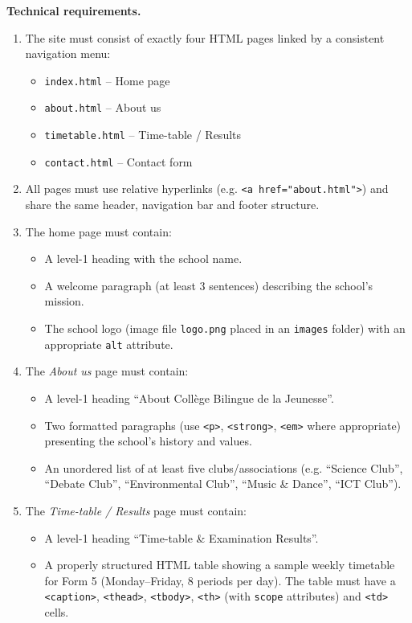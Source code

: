 \documentclass[11pt]{article}
\newcommand{\cle}[1]{{\popxbold\color{popdark}#1}}
\begin{document}
\textbf{Technical requirements.}
\begin{enumerate}
  \item The site must consist of exactly four HTML pages linked by a consistent navigation menu:
        \begin{itemize}
          \item \texttt{index.html} -- Home page
          \item \texttt{about.html} -- About us
          \item \texttt{timetable.html} -- Time-table / Results
          \item \texttt{contact.html} -- Contact form
        \end{itemize}
  \item All pages must use \cle{relative hyperlinks} (e.g. \texttt{<a href="about.html">}) and share the same header, navigation bar and footer structure.
  \item The home page must contain:
        \begin{itemize}
          \item A level-1 heading with the school name.
          \item A welcome paragraph (at least 3 sentences) describing the school's mission.
          \item The school logo (image file \texttt{logo.png} placed in an \texttt{images} folder) with an appropriate \texttt{alt} attribute.
        \end{itemize}
  \item The \emph{About us} page must contain:
        \begin{itemize}
          \item A level-1 heading ``About Coll\`ege Bilingue de la Jeunesse''.
          \item Two formatted paragraphs (use \texttt{<p>}, \texttt{<strong>}, \texttt{<em>} where appropriate) presenting the school's history and values.
          \item An unordered list of at least five clubs/associations (e.g. ``Science Club'', ``Debate Club'', ``Environmental Club'', ``Music \& Dance'', ``ICT Club'').
        \end{itemize}
  \item The \emph{Time-table / Results} page must contain:
        \begin{itemize}
          \item A level-1 heading ``Time-table \& Examination Results''.
          \item A properly structured HTML table showing a sample weekly timetable for Form 5 (Monday--Friday, 8 periods per day). The table must have a \texttt{<caption>}, \texttt{<thead>}, \texttt{<tbody>}, \texttt{<th>} (with \texttt{scope} attributes) and \texttt{<td>} cells.

\end{itemize}
\end{enumerate}
\end{document}
